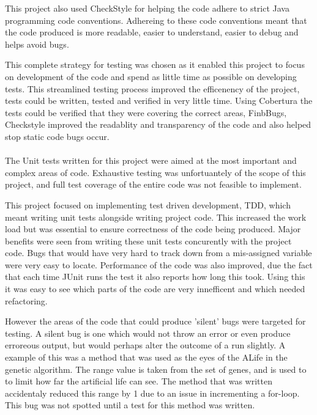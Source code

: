 \documentclass[10pt,twocolumn]{article}
\begin{document}
This project also used
CheckStyle for helping the code adhere to strict Java programming code conventions. Adhereing to these code conventions meant that
the code produced is more readable, easier to understand, easier to debug and helps avoid bugs.

This complete strategy for testing was chosen as it enabled this project to focus on development of the code and spend as little
time as possible on developing tests. This streamlined testing process improved the efficenency of the project, tests could 
be written, tested and verified in very little time. Using Cobertura the tests could be verified that they were covering the
correct areas, FinbBugs, Checkstyle improved the readablity and transparency of the code and also helped stop static code
bugs occur.


\paragraph{}

The Unit tests written for this project were aimed at the most important and complex areas of code. Exhaustive testing was 
unfortuantely of the scope of this project, and full test coverage of the entire code was not feasible to implement.

This project focused on implementing test driven development, TDD, which meant writing unit tests alongside writing project code.
This increased the work load but was essential to ensure correctness of the code being produced. Major benefits were seen from
writing these unit tests concurently with the project code. Bugs that would have very hard to track down from a mis-assigned
variable were very easy to locate. Performance of the code was also improved, due the fact that each time JUnit runs the test
it also reports how long this took. Using this it was easy to see which parts of the code are very innefficent and which needed
refactoring. 

However the 
areas of the code that could produce 'silent' bugs were targeted for testing. A silent bug is one which would not throw an error
or even produce erroreous output, but would perhaps alter the outcome of a run slightly. A example of this was a method that
was used as the eyes of the ALife in the genetic algorithm. The range value is taken from the set of genes, and is used to 
to limit how far the artificial life can see. The method that was written accidentaly reduced this range by 1 due to an issue
in incrementing a for-loop. This bug was not spotted until a test for this method was written. 
\end{document}
